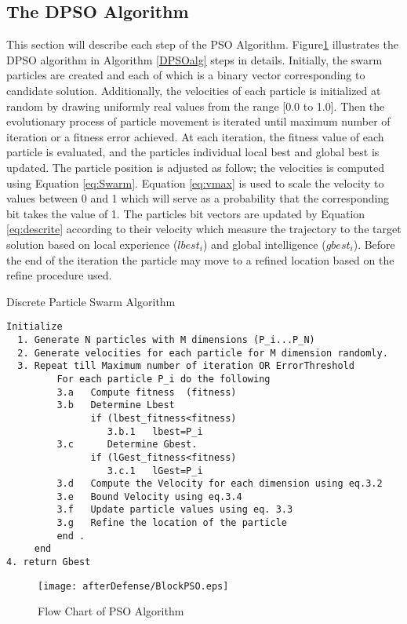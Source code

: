 \subsection{The DPSO Algorithm}
\label{sec:ParticleSwarmAlgorithm} 

This section will describe each step of the PSO Algorithm. Figure\ref{fig:BlockPSO} illustrates the DPSO algorithm in Algorithm \ref{DPSOalg} steps in details. Initially, the swarm particles are created and each of which is a binary vector corresponding to candidate solution. Additionally, the velocities of each particle is initialized at random by drawing uniformly real values from the range [0.0 to 1.0]. Then the evolutionary process of particle movement is iterated until maximum number of iteration or a fitness error achieved. At each iteration,  the fitness value of each particle is evaluated, and the particles individual local best and global best is updated. The particle position is adjusted as follow; the velocities is computed using Equation \ref{eq:Swarm}. Equation \ref{eq:vmax} is used to scale the velocity to values between 0 and 1 which will serve as a probability that the corresponding bit takes the value of 1. The particles bit vectors are updated by Equation \ref{eq:descrite} according to their velocity which measure the trajectory to the target solution based on local experience ($lbest_{i}$) and global intelligence ($gbest_{i}$). Before the end of the iteration the particle may move to a refined location based on the refine procedure used. 
\begin{algorithm}
\caption{ Discrete Particle Swarm Algorithm }
\label{DPSOalg}
\begin{verbatim}
Initialize 
  1. Generate N particles with M dimensions (P_i...P_N) 
  2. Generate velocities for each particle for M dimension randomly. 
  3. Repeat till Maximum number of iteration OR ErrorThreshold  
         For each particle P_i do the following 
         3.a   Compute fitness  (fitness)
         3.b   Determine Lbest  
               if (lbest_fitness<fitness)
                  3.b.1   lbest=P_i
         3.c      Determine Gbest.
               if (lGest_fitness<fitness)
                  3.c.1   lGest=P_i
         3.d   Compute the Velocity for each dimension using eq.3.2 
         3.e   Bound Velocity using eq.3.4
         3.f   Update particle values using eq. 3.3
         3.g   Refine the location of the particle
         end .
     end 
4. return Gbest
\end{verbatim}
  \end{algorithm}
  
\begin{figure}
	\centering
		\texttt{[image: afterDefense/BlockPSO.eps]}
	\caption{Flow Chart of PSO Algorithm }
	\label{fig:BlockPSO}
\end{figure}